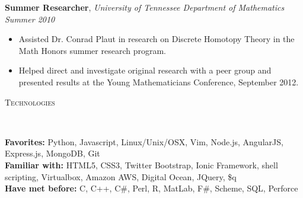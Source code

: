 \documentclass[9pt]{article}
\newenvironment{changemargin}[2]{%
  \begin{list}{}{%
    \setlength{\topsep}{0pt}%
    \setlength{\leftmargin}{#1}%
    \setlength{\rightmargin}{#2}%
    \setlength{\listparindent}{\parindent}%
    \setlength{\itemindent}{\parindent}%
    \setlength{\parsep}{\parskip}%
  }%
  \item[]}{\end{list}
}
\newcommand{\lineover}{
	\begin{changemargin}{-0.05in}{-0.05in}
		\vspace*{-8pt}
		\hrulefill \\
		\vspace*{-2pt}
	\end{changemargin}
}
\newcommand{\header}[1]{
	\begin{changemargin}{-0.5in}{-0.5in}
		\scshape{#1}\\
  	\lineover
	\end{changemargin}
}
\newenvironment{body} {
	\vspace*{-16pt}
	\begin{changemargin}{-0.25in}{-0.5in}
  }	
	{\end{changemargin}
}
\begin{document}
\begin{body}
	\textbf {Summer Researcher}, \emph{University of Tennessee Department of Mathematics} \hfill \emph{Summer 2010}\\
	\vspace*{-4pt}
	\begin{itemize} \itemsep -0pt
		\item Assisted Dr. Conrad Plaut in research on Discrete Homotopy Theory in the Math Honors summer research program.
		\item Helped direct and investigate original research with a peer group and presented results at the Young Mathematicians Conference, September 2012.
	\end{itemize}
	\begin{comment}
	\textbf {Assistant Waterfront Director}, \emph{Kia Kima Scout Reservation} \hfill \emph{Summers, 2008 - 09}\\
	\vspace*{-4pt}
	\begin{itemize} \itemsep -0pt
		\item Instructed waterfront merit badges, including lifesaving and CPR skills.
		\item Managed other instructors and ensured safety with both preventative and remedial action.
	\end{itemize}
	\end{comment}
	
\end{body}

\smallskip



\header{Technologies}

\begin{body}
	\vspace{14pt}
	\textbf{Favorites:}{} Python, Javascript, Linux/Unix/OSX, Vim, Node.js, AngularJS, Express.js, MongoDB, Git\\
	\medskip
	\textbf{Familiar with:}{} HTML5, CSS3, Twitter Bootstrap, Ionic Framework, shell scripting, Virtualbox, Amazon AWS,
    Digital Ocean, JQuery, \$q\\
	\medskip
	\textbf{Have met before:}{} C, C++, C\#, Perl, R, MatLab, F#, Scheme, SQL, Perforce \\
	\medskip
\end{body}
\end{document}
